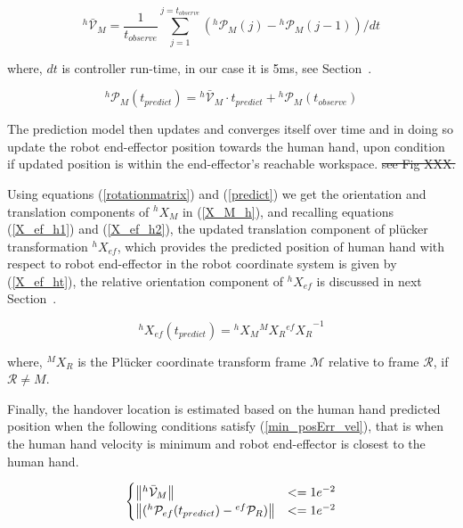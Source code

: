 \begin{equation} \label{predictVel}
{}^{h}\mathcal{\bar{V}}_{M} = \frac{1}{t_{observe}}{\sum_{j=1}^{j=t_{observe}} ({}^{h}\mathcal{P}_{M}(j)-{}^{h}\mathcal{P}_{M}(j-1))/dt }
\end{equation}

where, $dt$ is controller run-time, in our case it is 5ms, see Section~.

\begin{equation} \label{predict}
{}^{h}\mathcal{P}_M(t_{predict}) = {}^{h}\mathcal{\bar{V}}_{M} \cdot t_{predict}  + {}^{h}\mathcal{P}_{M}(t_{observe})
\end{equation}


The prediction model then updates and converges itself over time and in doing so update the robot end-effector position towards the human hand, upon condition if updated position is within the end-effector's reachable workspace. \sout{see Fig XXX.}

Using equations (\ref{rotationmatrix}) and (\ref{predict}) we get the orientation and translation components of ${}^{h}{X}_M$ in (\ref{X_M_h}), and recalling equations (\ref{X_ef_h1}) and (\ref{X_ef_h2}), the updated translation component of pl\"ucker transformation ${}^{h}{X}_{ef}$, which provides the predicted position of human hand with respect to robot end-effector in the robot coordinate system is given by (\ref{X_ef_ht}), the relative orientation component of ${}^{h}{X}_{ef}$ is discussed in next Section~.

\begin{equation}\label{X_ef_ht}
{}^{h}{X}_{ef}(t_{predict}) =  {}^{h}{X}_M  {}^{M}{X}_R {{}^{ef}{X}_R}^{-1}
\end{equation}

where, ${}^{M}{X}_R$ is the Pl\"ucker coordinate transform frame $\mathcal{M}$ relative to frame $\mathcal{R}$, if $\mathcal R \neq M$.


Finally, the handover location is estimated based on the human hand predicted position when the following conditions satisfy (\ref{min_posErr_vel}), that is when the human hand velocity is minimum and robot end-effector is closest to the human hand.

\begin{equation}\label{min_posErr_vel}
\begin{cases}
	\norm{{}^{h}\mathcal{\bar{V}}_{M}}& <= 1e^{-2} \\
	\norm{({}^{h}\mathcal{P}_{ef}(t_{predict}) - {}^{ef}\mathcal{P}_{R})} & <= 1e^{-2}
\end{cases}
\end{equation}

